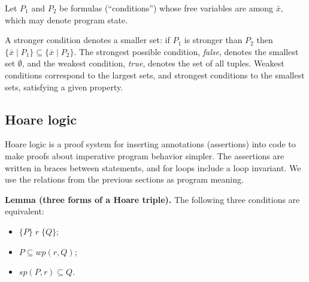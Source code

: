 Let $P_1$ and $P_2$ be formulas (``conditions'') whose free variables are among $\bar x$, which may denote program state.
 
 
A stronger condition denotes a smaller set: if $P_1$ is stronger than $P_2$ then $\{\bar x \mid P_1\} \subseteq \{\bar x \mid P_2\}$. The strongest possible condition, \emph{false}, denotes the smallest set $\emptyset$, and the weakest condition, \emph{true}, denotes the set of all tuples. Weakest conditions correspond to the largest sets, and strongest conditions to the smallest sets, satisfying a given property.
 
\subsection*{Hoare logic}
 
Hoare logic is a proof system for inserting annotations (assertions) into code to make proofs about imperative program behavior simpler. The assertions are written in braces between statements, and for loops include a loop invariant. We use the relations from the previous sections as program meaning.
 
 
 
 
\noindent\textbf{Lemma (three forms of a Hoare triple).} The following three conditions are equivalent:
\begin{itemize}
  \item $\{P\}\; r\; \{Q\}$;
  \item $P \subseteq wp(r, Q)$;
  \item $sp(P, r) \subseteq Q$.
\end{itemize}
 
